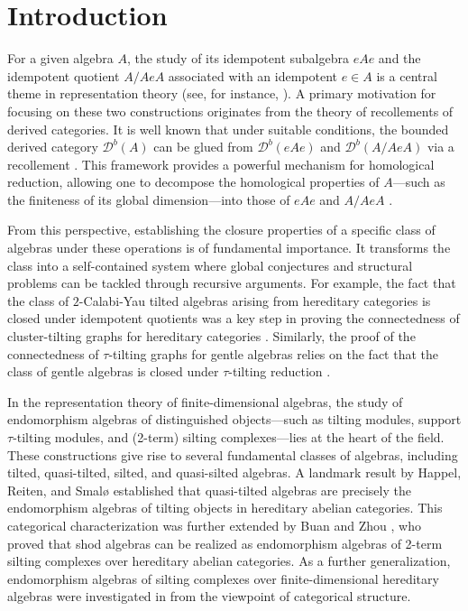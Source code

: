 \documentclass[12pt,a4paper,reqno]{amsart}
\theoremstyle{definition}
\begin{document}
\section{Introduction}


For a given algebra $A$, the study of its idempotent subalgebra $eAe$ and the idempotent quotient $A/AeA$ associated with an idempotent $e \in A$ is a central theme in representation theory (see, for instance, \cite{CPS88, AC04, X, Xu, CK25}). A primary motivation for focusing on these two constructions originates from the theory of recollements of derived categories. It is well known that under suitable conditions, the bounded derived category $\mathcal{D}^b(A)$ can be glued from $\mathcal{D}^b(eAe)$ and $\mathcal{D}^b(A/AeA)$ via a recollement \cite{CPS88}. This framework provides a powerful mechanism for homological reduction, allowing one to decompose the homological properties of $A$---such as the finiteness of its global dimension---into those of $eAe$ and $A/AeA$ \cite{AKLY}.

From this perspective, establishing the closure properties of a specific class of algebras under these operations is of fundamental importance. It transforms the class into a self-contained system where global conjectures and structural problems can be tackled through recursive arguments. For example, the fact that the class of $2$-Calabi-Yau tilted algebras arising from hereditary categories is closed under idempotent quotients was a key step in proving the connectedness of cluster-tilting graphs for hereditary categories \cite{FG21}. Similarly, the proof of the connectedness of $\tau$-tilting graphs for gentle algebras  relies on the fact that the class of gentle algebras is closed under $\tau$-tilting reduction \cite{FGLZ}.


In the representation theory of finite-dimensional algebras, the study of endomorphism algebras of distinguished objects---such as tilting modules, support $\tau$-tilting modules, and (2-term) silting complexes---lies at the heart of the field. These constructions give rise to several fundamental classes of algebras, including tilted, quasi-tilted, silted, and quasi-silted algebras. A landmark result by Happel, Reiten, and Smal{\o} \cite{HRS} established that quasi-tilted algebras are precisely the endomorphism algebras of tilting objects in hereditary abelian categories. This categorical characterization was further extended by Buan and Zhou \cite{BZ16a, BZ16b}, who proved that shod algebras can be realized as endomorphism algebras of 2-term silting complexes over hereditary abelian categories. As a further generalization, endomorphism algebras of silting complexes over finite-dimensional hereditary algebras were investigated in \cite{ALLT} from the viewpoint of categorical structure.
\end{document}
